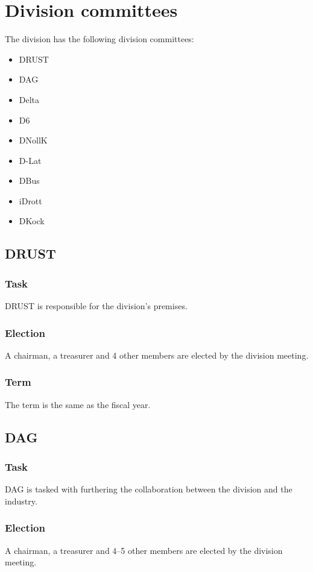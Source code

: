 \section{Division committees}

The division has the following division committees:

\begin{itemize}
  \item DRUST 
  \item DAG 
  \item Delta 
  \item D6 
  \item DNollK
  \item D-Lat
  \item DBus
  \item iDrott
  \item DKock
\end{itemize}

\subsection{DRUST} 

\subsubsection{Task}
DRUST is responsible for the division's premises. 

\subsubsection{Election}
A chairman, a treasurer and 4 other members are elected by the division meeting. 

\subsubsection{Term}
The term is the same as the fiscal year. 

\subsection{DAG}

\subsubsection{Task}
DAG is tasked with furthering the collaboration between the division and the industry. 

\subsubsection{Election}
A chairman, a treasurer and 4--5 other members are elected by the division meeting. 

